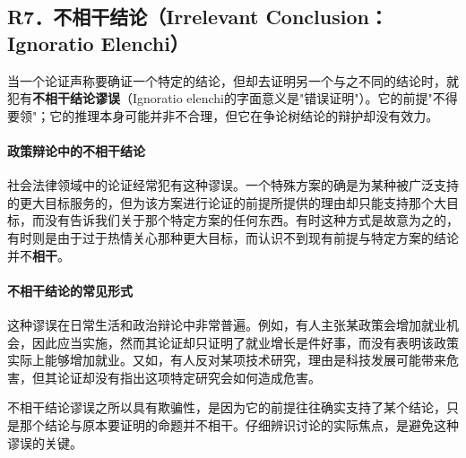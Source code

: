 \subsection{R7．不相干结论（Irrelevant Conclusion：Ignoratio Elenchi）}

当一个论证声称要确证一个特定的结论，但却去证明另一个与之不同的结论时，就犯有\textbf{不相干结论谬误}（Ignoratio elenchi的字面意义是"错误证明"）。它的前提"不得要领"；它的推理本身可能并非不合理，但它在争论树结论的辩护却没有效力。

\paragraph{政策辩论中的不相干结论}
社会法律领域中的论证经常犯有这种谬误。一个特殊方案的确是为某种被广泛支持的更大目标服务的，但为该方案进行论证的前提所提供的理由却只能支持那个大目标，而没有告诉我们关于那个特定方案的任何东西。有时这种方式是故意为之的，有时则是由于过于热情关心那种更大目标，而认识不到现有前提与特定方案的结论并不\textbf{相干}。

\paragraph{不相干结论的常见形式}
这种谬误在日常生活和政治辩论中非常普遍。例如，有人主张某政策会增加就业机会，因此应当实施，然而其论证却只证明了就业增长是件好事，而没有表明该政策实际上能够增加就业。又如，有人反对某项技术研究，理由是科技发展可能带来危害，但其论证却没有指出这项特定研究会如何造成危害。

不相干结论谬误之所以具有欺骗性，是因为它的前提往往确实支持了某个结论，只是那个结论与原本要证明的命题并不相干。仔细辨识讨论的实际焦点，是避免这种谬误的关键。 